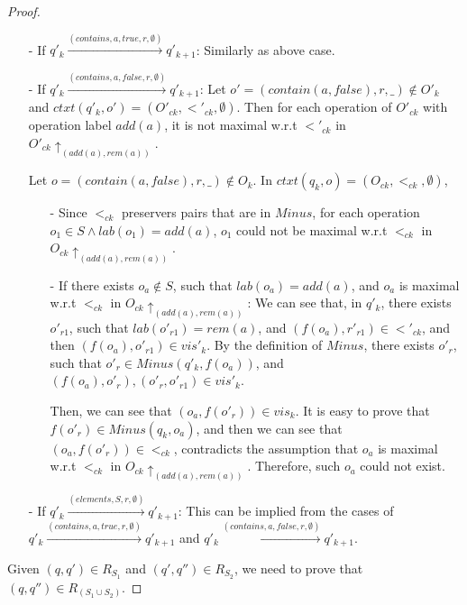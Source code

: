 \begin {proof}
\begin{itemize}
\item[-] If $q'_k {\xrightarrow{(contains,a,\mathit{true},r,\emptyset)}} q'_{k+1}$: Similarly as above case.

\item[-] If $q'_k {\xrightarrow{(contains,a,\mathit{false},r,\emptyset)}} q'_{k+1}$: Let $o' = (contain(a,\textit{false}),r,\_) \notin O'_k$ and $ctxt(q'_k,o') = (O'_{ck},<'_{ck},\emptyset)$. Then for each operation of $O'_{ck}$ with operation label $add(a)$, it is not maximal w.r.t $<'_{ck}$ in $O'_{ck} \uparrow_{ (add(a),rem(a)) }$.

    Let $o = (contain(a,\textit{false}),r,\_) \notin O_k$. In $ctxt(q_k,o) = (O_{ck},<_{ck},\emptyset)$,

    \begin{itemize}
    \setlength{\itemsep}{0.5pt}
    \item[-] Since $<_{ck}$ preservers pairs that are in $Minus$, for each operation $o_1 \in S \wedge lab(o_1) = add(a)$, $o_1$ could not be maximal w.r.t $<_{ck}$ in $O_{ck} \uparrow_{ (add(a),rem(a)) }$.

    \item[-] If there exists $o_a \notin S$, such that $lab(o_a) = add(a)$, and $o_a$ is maximal w.r.t $<_{ck}$ in $O_{ck} \uparrow_{ (add(a),rem(a)) }$: We can see that, in $q'_k$, there exists $o'_{r1}$, such that $lab(o'_{r1}) = rem(a)$, and $(f(o_a),r'_{r1}) \in <'_{ck}$, and then $(f(o_a),o'_{r1}) \in \mathit{vis}'_k$. By the definition of $Minus$, there exists $o'_r$, such that $o'_r \in Minus(q'_k,f(o_a))$, and $(f(o_a),o'_r), (o'_r,o'_{r1}) \in \mathit{vis}'_k$.

        Then, we can see that $(o_a,f(o'_r)) \in \mathit{vis}_k$. It is easy to prove that $f(o'_r) \in Minus(q_k,o_a)$, and then we can see that $(o_a,f(o'_r)) \in <_{ck}$, contradicts the assumption that $o_a$ is maximal w.r.t $<_{ck}$ in $O_{ck} \uparrow_{ (add(a),rem(a)) }$. Therefore, such $o_a$ could not exist.
    \end{itemize}

\item[-] If $q'_k {\xrightarrow{(elements,S,r,\emptyset)}} q'_{k+1}$: This can be implied from the cases of $q'_k {\xrightarrow{(contains,a,\mathit{true},r,\emptyset)}} q'_{k+1}$ and $q'_k {\xrightarrow{(contains,a,\mathit{false},r,\emptyset)}} q'_{k+1}$.

\end{itemize}

Given $(q,q') \in R_{ S_1 }$ and $(q',q'') \in R_{ S_2 }$, we need to prove that $(q,q'') \in R_{ ( S_1 \cup S_2 ) }$.


\end{proof}
